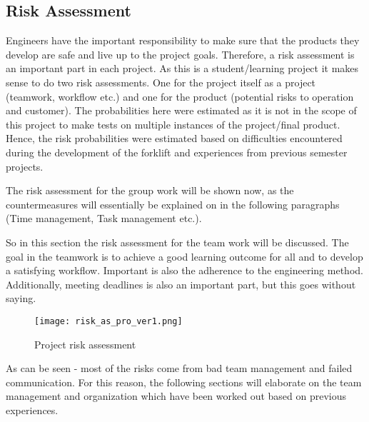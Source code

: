 \documentclass[../report.tex]{subfiles}
\begin{document}
\subsection{Risk Assessment}
Engineers have the important responsibility to make sure that the products
they develop are safe and live up to the project goals. Therefore, a
risk assessment is an important part in each project. As this is a student/learning
project it makes sense to do two risk assessments. One for the project itself as a project (teamwork, workflow etc.) and one for the product (potential risks to 
operation and customer). The probabilities here were estimated as it is not in the scope of 
this project to make tests on multiple instances of the project/final product. Hence, the risk probabilities were estimated 
based on difficulties encountered during the development of the forklift and experiences
from previous semester projects.

The risk assessment for the group work will be shown now, as the countermeasures will essentially be 
explained on in the following paragraphs (Time management, Task management etc.).

So in this section the risk assessment for the team work will be discussed. The goal in the 
teamwork is to achieve a good learning outcome for all and to develop a satisfying workflow.
Important is also the adherence to the engineering method. Additionally, meeting deadlines is also
an important part, but this goes without saying.

\begin{figure}[h!]
    \centering
    \texttt{[image: risk\_as\_pro\_ver1.png]}
    \caption{Project risk assessment}
 \end{figure}

As can be seen - most of the risks come from bad team management and failed communication. For this reason, 
the following sections will elaborate on the team management and organization which have been 
worked out based on previous experiences.
\end{document}
